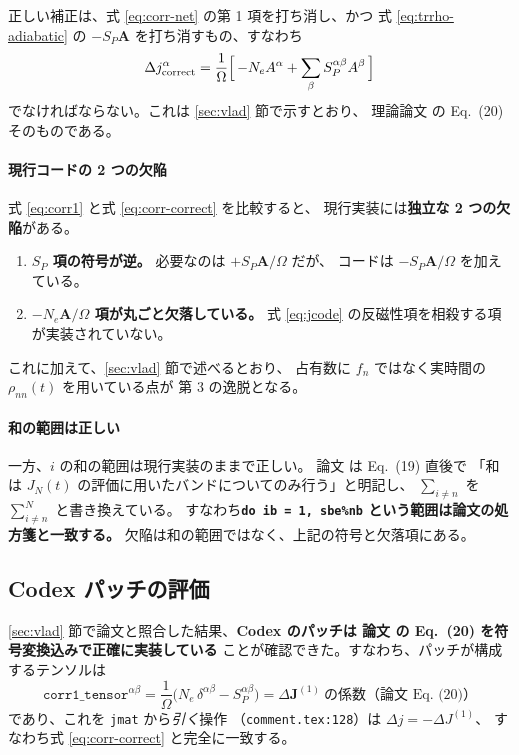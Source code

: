 \documentclass[dvipdfmx,a4paper,11pt]{jsarticle}
\newcommand{\file}[1]{\texttt{#1}}
\newcommand{\vA}{\bm{A}}
\begin{document}
正しい補正は、式 \eqref{eq:corr-net} の第 1 項を打ち消し、かつ
式 \eqref{eq:trrho-adiabatic} の $-S_P\vA$ を打ち消すもの、すなわち
%
\begin{equation}
  \Delta j^\alpha_{\text{correct}}
  = \frac{1}{\Omega}\Bigl[\,-N_e A^\alpha + \sum_\beta S_P^{\alpha\beta}A^\beta\,\Bigr]
  \label{eq:corr-correct}
\end{equation}
%
でなければならない。これは \ref{sec:vlad} 節で示すとおり、
理論論文 \cite{yakovlev2017} の Eq.~(20) そのものである。

\paragraph{現行コードの 2 つの欠陥}
式 \eqref{eq:corr1} と式 \eqref{eq:corr-correct} を比較すると、
現行実装には\textbf{独立な 2 つの欠陥}がある。

\begin{enumerate}
\item \textbf{$S_P$ 項の符号が逆。} 必要なのは $+S_P\vA/\Omega$ だが、
      コードは $-S_P\vA/\Omega$ を加えている。
\item \textbf{$-N_e\vA/\Omega$ 項が丸ごと欠落している。}
      式 \eqref{eq:jcode} の反磁性項を相殺する項が実装されていない。
\end{enumerate}

これに加えて、\ref{sec:vlad} 節で述べるとおり、
占有数に $f_n$ ではなく実時間の $\rho_{nn}(t)$ を用いている点が
第 3 の逸脱となる。

\paragraph{和の範囲は正しい}
一方、$i$ の和の範囲は現行実装のままで正しい。
論文 \cite{yakovlev2017} は Eq.~(19) 直後で
「和は $J_N(t)$ の評価に用いたバンドについてのみ行う」と明記し、
$\sum_{i\neq n}$ を $\sum^{N}_{i\neq n}$ と書き換えている。
すなわち\textbf{\texttt{do ib = 1, sbe\%nb} という範囲は論文の処方箋と一致する。}
欠陥は和の範囲ではなく、上記の符号と欠落項にある。

\subsection{Codex パッチの評価}

\ref{sec:vlad} 節で論文と照合した結果、\textbf{Codex のパッチは
論文 \cite{yakovlev2017} の Eq.~(20) を符号変換込みで正確に実装している}
ことが確認できた。すなわち、パッチが構成するテンソルは
%
\begin{equation}
  \texttt{corr1\_tensor}^{\alpha\beta}
  = \frac{1}{\Omega}\bigl(N_e\,\delta^{\alpha\beta} - S_P^{\alpha\beta}\bigr)
  = \Delta \mathbf{J}^{(1)}\ \text{の係数（論文 Eq.~(20)）}
  \label{eq:codex-tensor}
\end{equation}
%
であり、これを \verb|jmat| から\emph{引く}操作
（\file{comment.tex:128}）は $\Delta j = -\Delta J^{(1)}$、
すなわち式 \eqref{eq:corr-correct} と完全に一致する。
\end{document}
